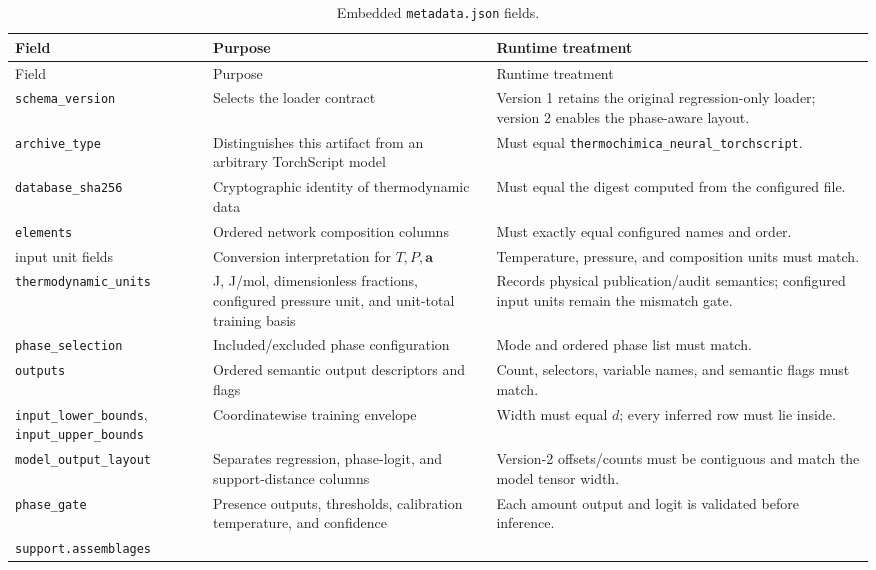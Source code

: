 \documentclass[11pt]{article}
\newcommand{\code}[1]{\texttt{#1}}
\begin{document}
\begin{longtable}{L{0.25\textwidth}L{0.27\textwidth}L{0.40\textwidth}}
  \caption{Embedded \code{metadata.json} fields.}
  \label{tab:metadata}\\
  \toprule
  Field & Purpose & Runtime treatment \\
  \midrule
  \endfirsthead
  \toprule
  Field & Purpose & Runtime treatment \\
  \midrule
  \endhead
  \code{schema\_version} &
  Selects the loader contract &
  Version 1 retains the original regression-only loader; version 2 enables the phase-aware
  layout. \\
  \code{archive\_type} &
  Distinguishes this artifact from an arbitrary TorchScript model &
  Must equal \code{thermochimica\_neural\_torchscript}. \\
  \code{database\_sha256} &
  Cryptographic identity of thermodynamic data &
  Must equal the digest computed from the configured file. \\
  \code{elements} &
  Ordered network composition columns &
  Must exactly equal configured names and order. \\
  input unit fields &
  Conversion interpretation for \(T,P,\boldsymbol{a}\) &
  Temperature, pressure, and composition units must match. \\
  \code{thermodynamic\_units} &
  J, J/mol, dimensionless fractions, configured pressure unit, and unit-total training basis &
  Records physical publication/audit semantics; configured input units remain the mismatch gate. \\
  \code{phase\_selection} &
  Included/excluded phase configuration &
  Mode and ordered phase list must match. \\
  \code{outputs} &
  Ordered semantic output descriptors and flags &
  Count, selectors, variable names, and semantic flags must match. \\
  \code{input\_lower\_bounds}, \code{input\_upper\_bounds} &
  Coordinatewise training envelope &
  Width must equal \(d\); every inferred row must lie inside. \\
  \code{model\_output\_layout} &
  Separates regression, phase-logit, and support-distance columns &
  Version-2 offsets/counts must be contiguous and match the model tensor width. \\
  \code{phase\_gate} &
  Presence outputs, thresholds, calibration temperature, and confidence &
  Each amount output and logit is validated before inference. \\
  \code{support.assemblages} &

\end{longtable}
\end{document}
